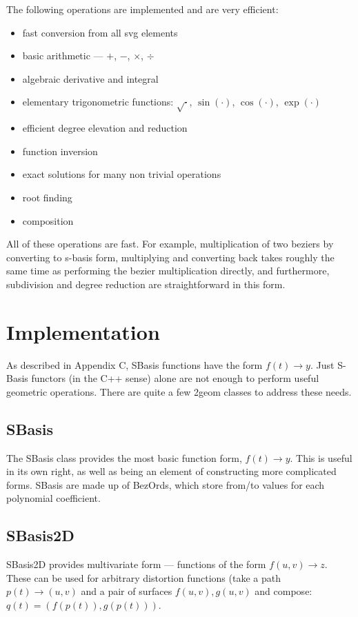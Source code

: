 \documentclass[openany]{book}
\newcommand{\code}[1]{\textsf{#1}}
\begin{document}
The following operations are implemented and are very efficient:
\begin{itemize}
\item fast conversion from all svg elements
\item basic arithmetic --- $+$, $-$, $\times$, $\div$
\item algebraic derivative and integral
\item elementary trigonometric functions: $\sqrt{\cdot}$, $\sin(\cdot)$, $\cos(\cdot)$, $\exp(\cdot)$
\item efficient degree elevation and reduction
\item function inversion
\item exact solutions for many non trivial operations
\item root finding
\item composition
\end{itemize}

All of these operations are fast.  For example, multiplication of two
beziers by converting to s-basis form, multiplying and converting back
takes roughly the same time as performing the bezier multiplication
directly, and furthermore, subdivision and degree reduction are
straightforward in this form.

\section{Implementation}
As described in Appendix C, SBasis functions have the form $f(t) \rightarrow y$.
Just S-Basis functors (in the C++ sense) alone are not enough to perform
useful geometric operations.  There are quite a few 2geom classes to
address these needs.

\subsection{SBasis}
The \code{SBasis} class provides the most basic function form,
$f(t) \rightarrow y$.  This is useful in its own right, as well as being an
element of constructing more complicated forms.  \code{SBasis} are made
up of \code{BezOrd}s, which store from/to values for each polynomial
coefficient.

\subsection{SBasis2D}
SBasis2D provides multivariate form --- functions of the form
$f(u,v) \rightarrow z$.  These can be used for arbitrary distortion
functions (take a path $p(t) \rightarrow (u,v)$ and a pair of surfaces
$f(u,v),g(u,v)$ and compose: $q(t) = (f(p(t)), g(p(t)))$.
\end{document}
